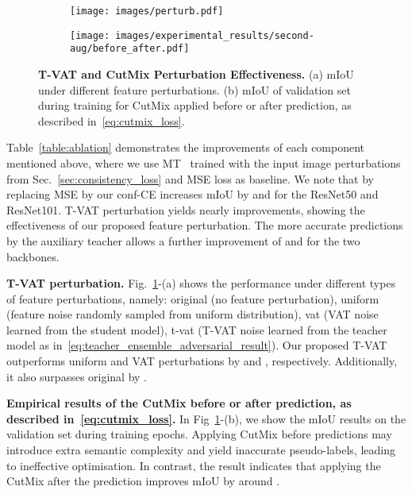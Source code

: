 \documentclass[10pt,twocolumn,letterpaper]{article}
\begin{document}
\begin{figure}[ht!]
    \centering     
    \begin{subfigure}[b]{0.49\linewidth}
         \centering    
            \texttt{[image:  images/perturb.pdf]}
        \caption{}
\end{subfigure}
    \begin{subfigure}[b]{0.490\linewidth}
        \centering    
        \texttt{[image:  images/experimental\_results/second-aug/before\_after.pdf]}
        \caption{}
\end{subfigure}
\caption{\textbf{T-VAT and CutMix Perturbation Effectiveness.} (a) mIoU under different feature perturbations. (b) mIoU of validation set during training for CutMix applied before or after prediction, as described in~\eqref{eq:cutmix_loss}. 
} \vspace{-5pt}
    \label{fig: perturbation}
\end{figure}
Table~\ref{table:ablation} demonstrates the improvements of each component mentioned above, where we use MT~\cite{tarvainen2017mean} trained with the input image perturbations from Sec.~\ref{sec:consistency_loss} and MSE loss as baseline. 
We note that by replacing MSE by our conf-CE increases mIoU by  and  for the ResNet50 and ResNet101. T-VAT perturbation yields nearly  improvements, showing the effectiveness of our proposed feature perturbation. The more accurate predictions by the auxiliary teacher allows a further improvement of  and  for the two backbones.




\textbf{T-VAT perturbation.} Fig.~\ref{fig: perturbation}-(a) shows the performance under different types of feature perturbations, namely: original (no feature perturbation), uniform (feature noise randomly sampled from uniform distribution), vat (VAT noise learned from the student model), t-vat (T-VAT noise learned from the teacher model as in~\eqref{eq:teacher_ensemble_adversarial_result}). Our proposed T-VAT outperforms uniform and VAT perturbations by  and , respectively. Additionally, it also surpasses original by . 

\textbf{Empirical results of the CutMix before or after prediction, as described in~\eqref{eq:cutmix_loss}.} In Fig~\ref{fig: perturbation}-(b), we show the mIoU results on the validation set during training epochs. Applying CutMix before predictions may introduce extra semantic complexity and yield inaccurate pseudo-labels, leading to ineffective optimisation. In contrast, the result indicates that applying the CutMix after the prediction improves mIoU by around . 
\end{document}
